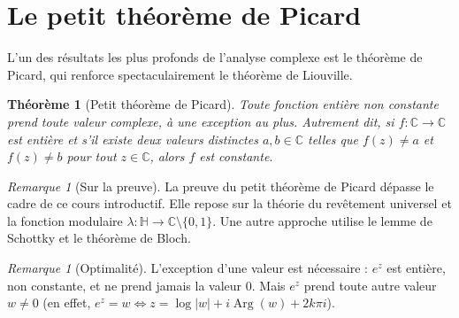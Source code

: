 \documentclass[12pt,a4paper,openany]{book}
\theoremstyle{definition}
\theoremstyle{plain}
\newtheorem{theoreme}[definition]{Théorème}
\theoremstyle{remark}
\newtheorem{remarque}[definition]{Remarque}
\newcommand{\C}{\mathbb{C}}
\DeclareMathOperator{\re}{Re}
\DeclareMathOperator{\im}{Im}
\DeclareMathOperator{\Arg}{Arg}
\newcommand{\abs}[1]{\left|#1\right|}
\begin{document}
\section{Le petit théorème de Picard}\label{sec:picard}

L'un des résultats les plus profonds de l'analyse complexe est le théorème de
Picard, qui renforce spectaculairement le théorème de Liouville.

\begin{theoreme}[Petit théorème de Picard]\label{thm:petit-picard}
Toute fonction entière non constante prend toute valeur complexe, à une
exception au plus. Autrement dit, si $f : \C \to \C$ est entière et s'il
existe deux valeurs distinctes $a, b \in \C$ telles que $f(z) \neq a$ et
$f(z) \neq b$ pour tout $z \in \C$, alors $f$ est constante.
\end{theoreme}

\begin{remarque}[Sur la preuve]\label{rem:picard-preuve}
La preuve du petit théorème de Picard dépasse le cadre de ce cours introductif.
Elle repose sur la théorie du revêtement universel et la fonction modulaire
$\lambda : \mathbb{H} \to \C \setminus \{0, 1\}$. Une autre approche utilise
le lemme de Schottky et le théorème de Bloch.
\end{remarque}

\begin{remarque}[Optimalité]\label{rem:picard-optimal}
L'exception d'une valeur est nécessaire : $e^z$ est entière, non constante,
et ne prend jamais la valeur $0$. Mais $e^z$ prend toute autre valeur
$w \neq 0$ (en effet, $e^z = w \Leftrightarrow z = \log\abs{w} + i\Arg(w) + 2k\pi i$).
\end{remarque}

\begin{center}
\end{center}
\end{document}
